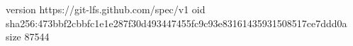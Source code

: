 version https://git-lfs.github.com/spec/v1
oid sha256:473bbf2cbbfc1e1e287f30d493447455fc9c93e83161435931508517ce7ddd0a
size 87544
